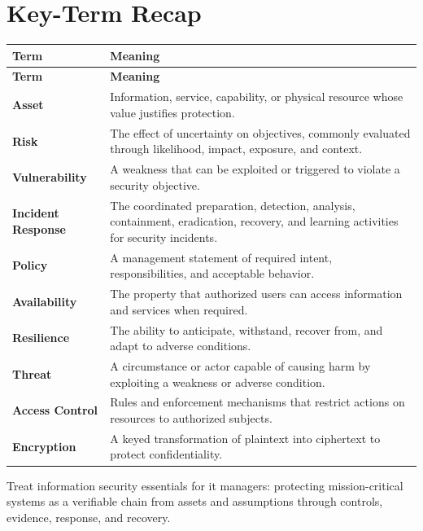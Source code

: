 \documentclass[11pt]{article}
\begin{document}
\section*{Key-Term Recap}
\begin{longtable}{>{\RaggedRight\arraybackslash}p{}>{\RaggedRight\arraybackslash}p{}}
\toprule\rowcolor{Navy}\color{white}\textbf{Term} & \color{white}\textbf{Meaning}\\\midrule
\endfirsthead
\toprule\rowcolor{Navy}\color{white}\textbf{Term} & \color{white}\textbf{Meaning}\\\midrule
\endhead
\textbf{Asset} & Information, service, capability, or physical resource whose value justifies protection. \\\midrule
\textbf{Risk} & The effect of uncertainty on objectives, commonly evaluated through likelihood, impact, exposure, and context. \\\midrule
\textbf{Vulnerability} & A weakness that can be exploited or triggered to violate a security objective. \\\midrule
\textbf{Incident Response} & The coordinated preparation, detection, analysis, containment, eradication, recovery, and learning activities for security incidents. \\\midrule
\textbf{Policy} & A management statement of required intent, responsibilities, and acceptable behavior. \\\midrule
\textbf{Availability} & The property that authorized users can access information and services when required. \\\midrule
\textbf{Resilience} & The ability to anticipate, withstand, recover from, and adapt to adverse conditions. \\\midrule
\textbf{Threat} & A circumstance or actor capable of causing harm by exploiting a weakness or adverse condition. \\\midrule
\textbf{Access Control} & Rules and enforcement mechanisms that restrict actions on resources to authorized subjects. \\\midrule
\textbf{Encryption} & A keyed transformation of plaintext into ciphertext to protect confidentiality. \\\midrule
\bottomrule
\end{longtable}
\begin{takeawaybox}
Treat information security essentials for it managers: protecting mission-critical systems as a verifiable chain from assets and assumptions through controls, evidence, response, and recovery.
\end{takeawaybox}
\end{document}

